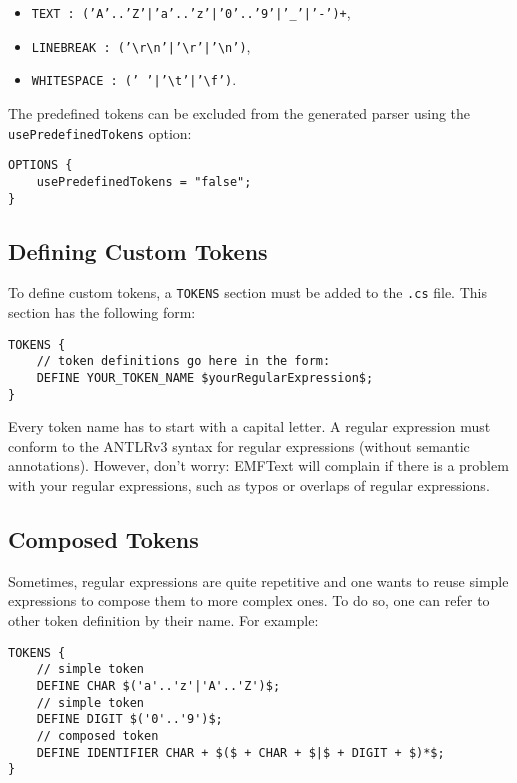 \begin{itemize}
  \item \texttt{TEXT : ('A'..'Z'|'a'..'z'|'0'..'9'|'\_'|'-')+},
  \item \texttt{LINEBREAK :
  ('\textbackslash{}r\textbackslash{}n'|'\textbackslash{}r'|'\textbackslash{}n')},
  \item \texttt{WHITESPACE : (' '|'\textbackslash{}t'|'\textbackslash{}f')}.
\end{itemize}

The predefined tokens can be excluded from the generated parser
using the \texttt{usePredefinedTokens} option:

\begin{lstlisting}
OPTIONS {
    usePredefinedTokens = "false";
}
\end{lstlisting}

\subsection{Defining Custom Tokens}

To define custom tokens, a \texttt{TOKENS} section must be added to the
\texttt{.cs} file. This section has the following form:

\begin{lstlisting}
TOKENS {
    // token definitions go here in the form:
    DEFINE YOUR_TOKEN_NAME $yourRegularExpression$;
}
\end{lstlisting}

Every token name has to start with a capital letter. A regular expression must
conform to the ANTLRv3 syntax for regular expressions (without semantic
annotations). However, don't worry: EMFText will complain if there is a problem
with your regular expressions, such as typos or overlaps of regular expressions.

\subsection{Composed Tokens}

Sometimes, regular expressions are quite repetitive and one wants to reuse 
simple expressions to compose them to more complex ones. To do so, one can refer 
to other token definition by their name. For example:

\begin{lstlisting}
TOKENS {
    // simple token
    DEFINE CHAR $('a'..'z'|'A'..'Z')$;
    // simple token
    DEFINE DIGIT $('0'..'9')$;
    // composed token
    DEFINE IDENTIFIER CHAR + $($ + CHAR + $|$ + DIGIT + $)*$;
}
\end{lstlisting}


